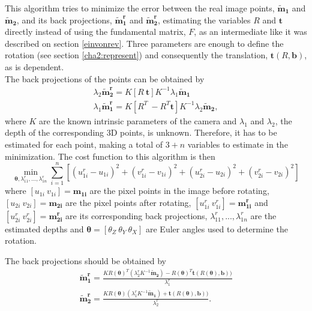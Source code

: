 This algorithm tries to minimize the error between the real image points, $\mathbf{\tilde{m}_1}$ and $\mathbf{\tilde{m}_2}$, and its back projections, $\mathbf{\tilde{m}^r_1}$ and $\mathbf{\tilde{m}^r_2}$, estimating the variables $R$ and $\mathbf{t}$ directly instead of using the fundamental matrix, $F$, as an intermediate like it was described on section \ref{einvonrev}. Three parameters are enough to define the rotation (see section \ref{cha2:represent}) and consequently the translation, $\mathbf{t}(R, \mathbf{b})$, as is dependent.\\
The back projections of the points can be obtained by
\begin{align}
\label{cha2:epipolar:shitshit1}
\lambda_2 \mathbf{\tilde{m}^r_2} = K [ R \ \mathbf{t} ] K^{-1} \lambda_1 \mathbf{\tilde{m}_1}\\
\label{cha2:epipolar:shitshit2}
\lambda_1 \mathbf{\tilde{m}^r_1} =  K [ R^{T} \ -R^{T}\mathbf{t} ] K^{-1}  \lambda_2 \mathbf{\tilde{m}_2},
\end{align}
where $K$ are the known intrinsic parameters of the camera and $\lambda_1$ and $\lambda_2$, the depth of the corresponding 3D points, is unknown. Therefore, it has to be estimated for each point, making a total of $3+n$ variables to estimate in the minimization.
The cost function to this algorithm is then
\begin{equation}
\label{fiorenfe}
	\min_{\mathbf{\theta}, \lambda^r_{11}, ..., \lambda^r_{1n}} \sum^n_{i=1} [(u^r_{1i}-u_{1i})^2  + (v^r_{1i}-v_{1i})^2 + (u^r_{2i}-u_{2i})^2 + (v^r_{2i}-v_{2i})^2]
\end{equation}
where $[u_{1i} \ v_{1i}] = \mathbf{m_{1i}}$ are the pixel points in the image before rotating, $[u_{2i} \ v_{2i}] = \mathbf{m_{2i}}$ are the pixel points after rotating, $[u_{1i}^r \ v_{1i}^r] = \mathbf{m_{1i}^r}$ and $[u_{2i}^r \ v_{2i}^r] = \mathbf{m_{2i}^r}$ are its corresponding back projections, $\lambda^r_{11}, ..., \lambda^r_{1n}$ are the estimated depths and $\mathbf{\theta} = [\theta_Z \ \theta_Y \ \theta_X]$ are Euler angles used to determine the rotation.

The back projections should be obtained by
\begin{align*}
	\mathbf{\tilde{m}_{1}^r} = \frac{KR(\mathbf{ \theta})^T(\lambda_{2}^r K^{-1}\mathbf{\tilde{m}_2}) - R(\mathbf{ \theta})^T \mathbf{t}(R(\mathbf{ \theta}), \mathbf{b}))}{\lambda_{1}^r}\\
	\mathbf{\tilde{m}_{2}^r} = \frac{KR(\mathbf{ \theta})(\lambda_{1}^r K^{-1}\mathbf{\tilde{m}_1}) + \mathbf{t}(R(\mathbf{ \theta}), \mathbf{b}))}{\lambda_{2}^r}.
\end{align*} 

